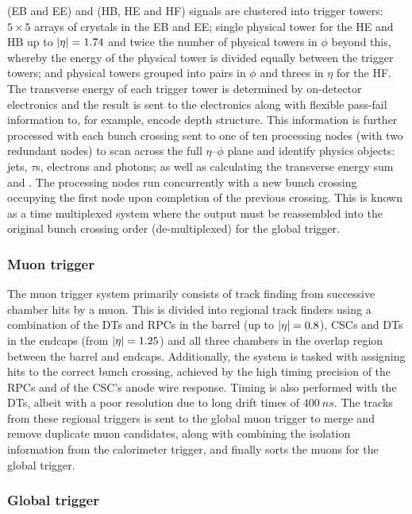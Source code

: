 \ECAL (EB and EE) and \HCAL (HB, HE and HF) signals are clustered into trigger
towers: ${5\times 5}$ arrays of crystals in the EB and EE; single physical
tower for the HE and HB up to ${|\eta|=1.74}$ and twice the number of physical
towers in $\phi$ beyond this, whereby the energy of the physical tower is
divided equally between the trigger towers; and physical towers grouped into
pairs in $\phi$ and threes in $\eta$ for the HF. The transverse energy of each
trigger tower is determined by on-detector electronics and the result is sent
to the \HWT electronics along with flexible pass-fail information to, for
example, encode depth structure. This information is further processed with
each bunch crossing sent to one of ten processing nodes (with two redundant
nodes) to scan across the full ${\eta}$--${\phi}$ plane and identify physics
objects: jets, $\tau$s, electrons and photons; as well as calculating the
transverse energy sum and \etmiss. The processing nodes run concurrently with
a new bunch crossing occupying the first node upon completion of the previous
crossing. This is known as a time multiplexed system where the output must be
reassembled into the original bunch crossing order (de-multiplexed) for the
global trigger.


\subsubsection{Muon trigger}

The muon trigger system primarily consists of track finding from successive
chamber hits by a muon. This is divided into regional track finders using a
combination of the DTs and RPCs in the barrel (up to ${|\eta|=0.8}$), CSCs and
DTs in the endcaps (from ${|\eta|=1.25}$) and all three chambers in the overlap
region between the barrel and endcaps. Additionally, the system is tasked with
assigning hits to the correct bunch crossing, achieved by the high timing
precision of the RPCs and of the CSC's anode wire response. Timing is also
performed with the DTs, albeit with a poor resolution due to long drift times of
${\SI{400}{ns}}$. The tracks from these regional triggers is sent to the
global muon trigger to merge and remove duplicate muon candidates, along with
combining the isolation information from the calorimeter trigger, and finally
sorts the muons for the global trigger.


\subsubsection{Global trigger}

